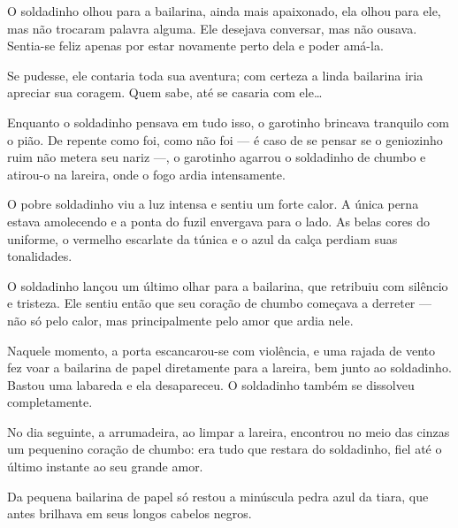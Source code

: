 \begin{myquote}
O soldadinho olhou para a bailarina, ainda mais apaixonado, ela olhou
para ele, mas não trocaram palavra alguma. Ele desejava conversar, mas
não ousava. Sentia-se feliz apenas por estar novamente perto dela e
poder amá-la.

Se pudesse, ele contaria toda sua aventura; com certeza a linda
bailarina iria apreciar sua coragem. Quem sabe, até se casaria com
ele\ldots{}

Enquanto o soldadinho pensava em tudo isso, o garotinho brincava
tranquilo com o pião. De repente como foi, como não foi --- é caso de se
pensar se o geniozinho ruim não metera seu nariz ---, o
garotinho agarrou o soldadinho de chumbo e atirou-o na lareira, onde o
fogo ardia intensamente.

O pobre soldadinho viu a luz intensa e sentiu um forte calor. A única
perna estava amolecendo e a ponta do fuzil envergava para o lado. As
belas cores do uniforme, o vermelho escarlate da túnica e o azul da
calça perdiam suas tonalidades.

O soldadinho lançou um último olhar para a bailarina, que retribuiu com
silêncio e tristeza. Ele sentiu então que seu coração de chumbo começava
a derreter --- não só pelo calor, mas principalmente pelo amor que ardia
nele.

Naquele momento, a porta escancarou-se com violência, e uma rajada de
vento fez voar a bailarina de papel diretamente para a lareira, bem
junto ao soldadinho. Bastou uma labareda e ela desapareceu. O soldadinho
também se dissolveu completamente.

No dia seguinte, a arrumadeira, ao limpar a lareira, encontrou no meio
das cinzas um pequenino coração de chumbo: era tudo que restara do
soldadinho, fiel até o último instante ao seu grande amor.

Da pequena bailarina de papel só restou a minúscula pedra azul da tiara,
que antes brilhava em seus longos cabelos negros.

\end{myquote}



